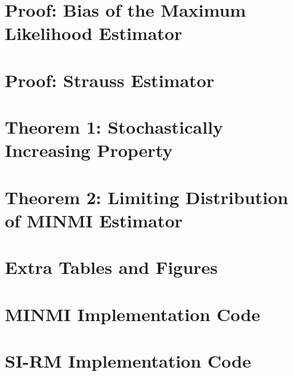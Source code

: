\documentclass[honours,12pt]{UNSWthesis}
\begin{document}


\appendix

\chapter{Proof: Bias of the Maximum Likelihood Estimator}\label{apx:mle-bias-proof}


\chapter{Proof: Strauss Estimator}\label{apx:strauss-estimator-proof}


\chapter{Theorem 1: Stochastically Increasing Property}\label{apx:minmi-stoch-incr-proof}


\chapter{Theorem 2: Limiting Distribution of MINMI Estimator}\label{apx:minmi-asymptotics-proof}


\chapter{Extra Tables and Figures}\label{apx:extra-tables-figures}


\chapter{MINMI Implementation Code}\label{apx:code-minmi}


\chapter{SI-RM Implementation Code}\label{apx:code-si-rm}


% 
% 
% 

\end{document}
